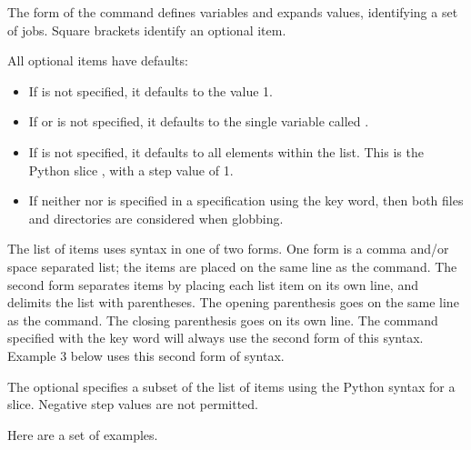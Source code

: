 The form of the  command defines
variables and expands values, 
identifying a set of jobs.
Square brackets identify an optional item.

  

     

      

     

All optional items have defaults:
\begin{itemize}
\item If  is not specified, it defaults to the value 1.
\item If  or  is not specified, it defaults to the single
variable called .
\item If  is not specified, it defaults to all elements
within the list.  This is the Python slice \Expr{[::]}, with a step
value of 1.
\item If neither  nor  is specified in a
specification using the  key word, then both files and directories
are considered when globbing.
\end{itemize}

The list of items uses syntax in one of two forms.
One form is a comma and/or space separated list;
the items are placed on the same line as the  command. 
The second form separates items by placing each list item on its own line,
and delimits the list with parentheses.
The opening parenthesis goes on the same line as 
the  command.
The closing parenthesis goes on its own line.
The  command specified with the key word 
will always use the second form of this syntax.
Example 3 below uses this second form of syntax.


The optional  specifies a subset of the list of items
using the Python syntax for a slice.
Negative step values are not permitted.

Here are a set of examples.

